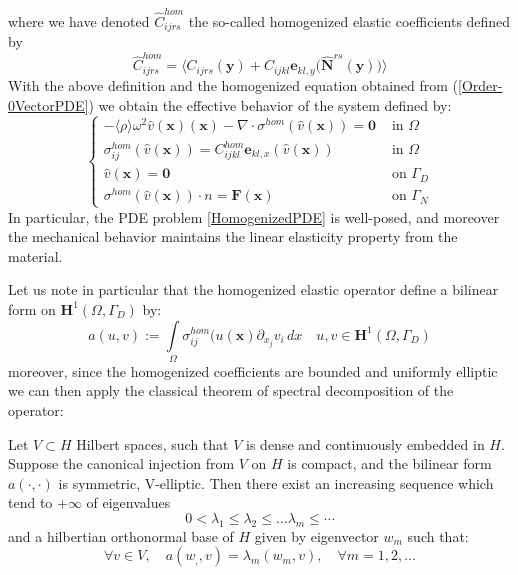where we have denoted $\hat{C}_{ijrs}^{hom}$ the so-called homogenized elastic coefficients defined by 
\begin{equation*}
    \hat{C}_{ijrs}^{hom} = \big \langle C_{ijrs}(\mathbf{y}) + C_{ijkl}\mathbf{e}_{kl,y}\big(\hat{\mathbf{N}}^{rs}(\mathbf{y})\big) \big \rangle 
\end{equation*}
With the above definition and the homogenized equation obtained from (\ref{Order-0VectorPDE}) we obtain the effective behavior of the system defined by:
\begin{equation}
    \label{HomogenizedPDE}
    \left \{
    \begin{array}{cc}
        - \langle \rho \rangle \omega^2 \hat{v}(\mathbf{x}) (\mathbf{x}) - \nabla \cdot \sigma^{hom} (\hat{v}(\mathbf{x}) ) = \mathbf{0} & \text{ in } \Omega \\
        \sigma^{hom}_{ij}(\hat{v}(\mathbf{x})) = C^{hom}_{ijkl}\mathbf{e}_{kl,x}(\hat{v}(\mathbf{x})) & \text{ in } \Omega \\
        \hat{v}(\mathbf{x}) = \mathbf{0} & \text{ on } \Gamma_D \\
        \sigma^{hom}(\hat{v}(\mathbf{x})) \cdot n = \mathbf{F}(\mathbf{x}) & \text{ on } \Gamma_N
    \end{array}
    \right .
\end{equation}
In particular, the PDE problem \ref{HomogenizedPDE} is well-posed, and moreover the mechanical behavior maintains the linear elasticity property from the material.

Let us note in particular that the homogenized elastic operator define a bilinear form on $\mathbf{H}^1(\Omega, \Gamma_D)$ by:
\begin{equation*}
    a(u,v) := \int \limits_{\Omega} \sigma^{hom}_{ij}(u(\mathbf{x}) \partial_{x_j} v_i \, dx \quad u,v \in \mathbf{H}^1(\Omega, \Gamma_D)
\end{equation*}
moreover, since the homogenized coefficients are bounded and uniformly elliptic we can then apply the classical theorem of spectral decomposition of the operator:
\begin{prop}
Let $V \subset H$ Hilbert spaces, such that $V$ is dense and continuously embedded in $H$. Suppose the canonical injection from $V$ on $H$ is compact, and the bilinear form $a(\cdot, \cdot)$ is symmetric, V-elliptic. Then there exist an increasing sequence which tend to $+ \infty$ of eigenvalues
\begin{equation*}
    0 < \lambda_1 \leq \lambda_2  \leq \dots \lambda_m \leq \cdots 
\end{equation*}
and a hilbertian orthonormal base of $H$ given by eigenvector $w_m$ such that:
\begin{equation*}
    \forall v \in V, \quad a(w_,, v) = \lambda_m (w_m, v), \quad \forall m = 1, 2, \dots
\end{equation*}
\end{prop}





